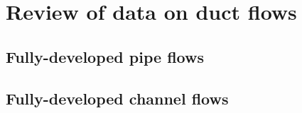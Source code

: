 %
\chapter{Review of data on duct flows}
\label{chp:review-duct-flows}

\section{Fully-developed pipe flows}

\begin{figure}
    \centering
    
    
\end{figure}

\begin{figure}
    \centering
    
    
\end{figure}

\section{Fully-developed channel flows}

\begin{figure}
    \centering
    
    
\end{figure}

\begin{figure}
    \centering
    
    
\end{figure}

